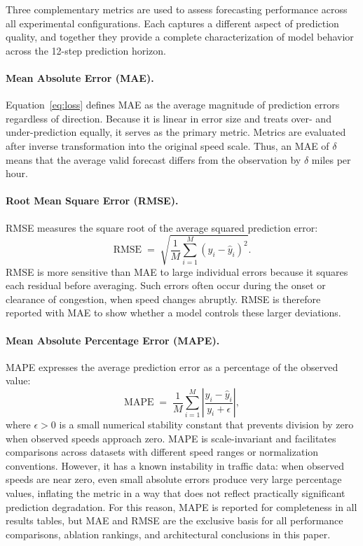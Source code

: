 \documentclass[fleqn,10pt]{wlscirep}
\newcommand{\chg}[1]{{\color{changeblue}#1}}
\begin{document}
Three complementary metrics are used to assess forecasting
performance across all experimental configurations. Each
captures a different aspect of prediction quality, and
together they provide a complete characterization of model
behavior across the 12-step prediction horizon.

\paragraph{Mean Absolute Error (MAE).}
Equation~\eqref{eq:loss} defines MAE as the average magnitude of prediction errors regardless of direction. Because it is linear in error size and treats over- and under-prediction equally, it serves as the primary metric. \chg{Metrics are evaluated after inverse transformation into the original speed scale. Thus, an MAE of $\delta$ means that the average valid forecast differs from the observation by $\delta$ miles per hour.}

\paragraph{Root Mean Square Error (RMSE).}
RMSE measures the square root of the average squared
prediction error:
%
\begin{equation}
    \mathrm{RMSE}
    \;=\; \sqrt{\frac{1}{M} \sum_{i=1}^{M}
    \left( y_i - \hat{y}_i \right)^2}.
    \label{eq:rmse}
\end{equation}
%
RMSE is more sensitive than MAE to large individual errors because it squares each residual before averaging. Such errors often occur during the onset or clearance of congestion, when speed changes abruptly. RMSE is therefore reported with MAE to show whether a model controls these larger deviations.

\paragraph{Mean Absolute Percentage Error (MAPE).}
MAPE expresses the average prediction error as a
percentage of the observed value:
%
\begin{equation}
    \mathrm{MAPE}
    \;=\; \frac{1}{M} \sum_{i=1}^{M}
    \left| \frac{y_i - \hat{y}_i}{y_i + \epsilon}
    \right|,
    \label{eq:mape}
\end{equation}
%
where $\epsilon > 0$ is a small numerical stability
constant that prevents division by zero when observed
speeds approach zero. MAPE is scale-invariant and
facilitates comparisons across datasets with different
speed ranges or normalization conventions. However, it
has a known instability in traffic data: when observed
speeds are near zero, even small absolute errors produce
very large percentage values, inflating the metric in
a way that does not reflect practically significant
prediction degradation. For this reason, MAPE is reported
for completeness in all results tables, but MAE and RMSE
are the exclusive basis for all performance comparisons,
ablation rankings, and architectural conclusions in this
paper.
\end{document}
